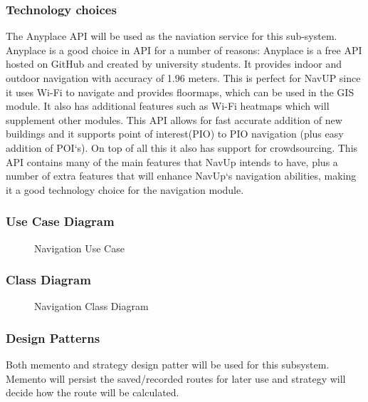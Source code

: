 \subsubsection{Technology choices}
	The Anyplace API will be used as the naviation service for this sub-system. Anyplace is a good
	choice in API for a number of reasons: Anyplace is a free API hosted on GitHub and created by
	university students. It provides indoor and outdoor navigation with accuracy of 1.96 meters.
	This is perfect for NavUP since it uses Wi-Fi to navigate and provides floormaps, which can be
	used in the GIS module. It also has additional features such as Wi-Fi heatmaps which will
	supplement other modules. This API allows for fast accurate addition of new buildings and it 
	supports point of interest(PIO) to PIO navigation (plus easy addition of POI`s). On top of all
	this it also has support for crowdsourcing. This API contains many of the main features that NavUp
	 intends to have, plus a number of extra features that will enhance NavUp`s navigation abilities,
	  making it a good technology choice for the navigation module.
\pagebreak
\subsubsection{Use Case Diagram}
	\begin{figure}[h!]
	\caption{Navigation Use Case}
	\end{figure}
\pagebreak
\subsubsection{Class Diagram}
	\begin{figure}[h!]
	\caption{Navigation Class Diagram}
	\end{figure}

\subsubsection{Design Patterns}
	Both memento and strategy design patter will be used for this subsystem. Memento will persist the saved/recorded routes for later use and strategy will decide how the route will be calculated.
